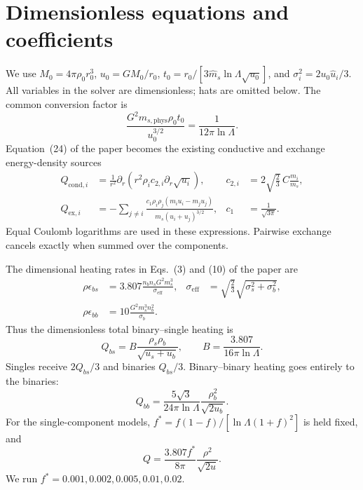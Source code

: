 \documentclass[11pt]{article}
\begin{document}
\section{Dimensionless equations and coefficients}
We use $M_0=4\pi\rho_0r_0^3$, $u_0=GM_0/r_0$,
$t_0=r_0/[3\widehat m_s\ln\Lambda\sqrt{u_0}]$, and
$\sigma_i^2=2u_0\widehat u_i/3$. All variables in the solver are
dimensionless; hats are omitted below. The common conversion factor is
\begin{equation}
 \frac{G^2m_{s,\mathrm{phys}}\rho_0t_0}{u_0^{3/2}}
 =\frac{1}{12\pi\ln\Lambda}.
\end{equation}
Equation~(24) of the paper becomes the existing conductive and exchange
energy-density sources
\begin{align}
 Q_{\mathrm{cond},i}&=\frac{1}{r^2}\partial_r
       \left(r^2\rho_i c_{2,i}\partial_r\sqrt{u_i}\right),&
 c_{2,i}&=2\sqrt{\frac23}\,C\frac{m_i}{m_s},\\
 Q_{\mathrm{ex},i}&=-\sum_{j\ne i}\frac{c_1\rho_i\rho_j
        (m_i u_i-m_j u_j)}{m_s(u_i+u_j)^{3/2}},&
 c_1&=\frac{1}{\sqrt{3\pi}}.
\end{align}
Equal Coulomb logarithms are used in these expressions. Pairwise exchange
cancels exactly when summed over the components.

The dimensional heating rates in Eqs.~(3) and (10) of the paper are
\begin{align}
 \rho\epsilon_{bs}&=3.807\frac{n_b n_sG^2m_s^3}{\sigma_{\mathrm{eff}}},&
 \sigma_{\mathrm{eff}}&=\sqrt{\frac23}\sqrt{\sigma_s^2+\sigma_b^2},\\
 \rho\epsilon_{bb}&=10\frac{G^2m_s^3n_b^2}{\sigma_b}.
\end{align}
Thus the dimensionless total binary--single heating is
\begin{equation}
 Q_{bs}=B\frac{\rho_s\rho_b}{\sqrt{u_s+u_b}},\qquad
 B=\frac{3.807}{16\pi\ln\Lambda}.
\end{equation}
Singles receive $2Q_{bs}/3$ and binaries $Q_{bs}/3$.
Binary--binary heating goes entirely to the binaries:
\begin{equation}
 Q_{bb}=\frac{5\sqrt3}{24\pi\ln\Lambda}
                  \frac{\rho_b^2}{\sqrt{2u_b}}.
\end{equation}
For the single-component models,
$f^*=f(1-f)/[\ln\Lambda(1+f)^2]$ is held fixed, and
\begin{equation}
 Q=\frac{3.807 f^*}{8\pi}\frac{\rho^2}{\sqrt{2u}}.
\end{equation}
We run $f^*=0.001,0.002,0.005,0.01,0.02$.
\end{document}
